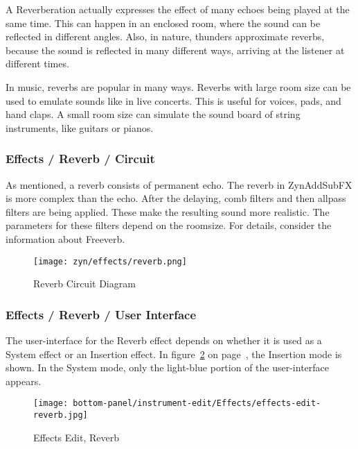    A Reverberation actually expresses the effect of many echoes being played
   at the same time. This can happen in an enclosed room, where the sound can
   be reflected in different angles. Also, in nature, thunders approximate
   reverbs, because the sound is reflected in many different ways, arriving
   at the listener at different times.

   In music, reverbs are popular in many ways. Reverbs with large room size
   can be used to emulate sounds like in live concerts. This is useful for
   voices, pads, and hand claps. A small room size can simulate the sound
   board of string instruments, like guitars or pianos.

\subsubsection{Effects / Reverb / Circuit}
\label{subsubsec:effects_edit_reverb_circuit}

   As mentioned, a reverb consists of permanent echo. The reverb in
   ZynAddSubFX is more complex than the echo. After the delaying, comb
   filters and then allpass filters are being applied. These make the
   resulting sound more realistic. The parameters for these filters depend on
   the roomsize. For details, consider the information about Freeverb.

\begin{figure}[H]
   \centering 
   \texttt{[image: zyn/effects/reverb.png]}
   \caption{Reverb Circuit Diagram}
   \label{fig:reverb_circuit_diagram}
\end{figure}

\subsubsection{Effects / Reverb / User Interface}
\label{subsubsec:effects_edit_reverb_ui}

   The user-interface for the Reverb effect depends on whether it is used as a
   System effect or an Insertion effect.
   In figure~\ref{fig:effects_edit_reverb} on
   page~\pageref{fig:effects_edit_reverb},
   the Insertion mode is shown.  In the System mode, only the light-blue
   portion of the user-interface appears.

\begin{figure}[H]
   \centering 
   \texttt{[image: bottom-panel/instrument-edit/Effects/effects-edit-reverb.jpg]}
   \caption{Effects Edit, Reverb}
   \label{fig:effects_edit_reverb}
\end{figure}

